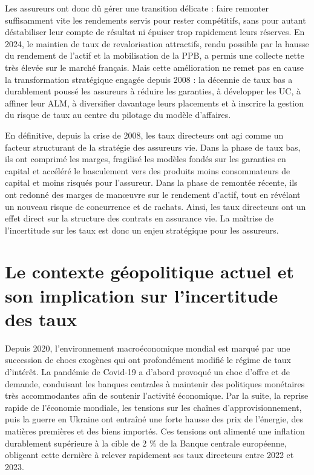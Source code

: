 Les assureurs ont donc dû gérer une transition délicate : faire remonter suffisamment vite les rendements servis pour rester compétitifs, sans pour autant déstabiliser leur compte de résultat ni épuiser trop rapidement leurs réserves. En 2024, le maintien de taux de revalorisation attractifs, rendu possible par la hausse du rendement de l'actif et la mobilisation de la PPB, a permis une collecte nette très élevée sur le marché français. Mais cette amélioration ne remet pas en cause la transformation stratégique engagée depuis 2008 : la décennie de taux bas a durablement poussé les assureurs à réduire les garanties, à développer les UC, à affiner leur ALM, à diversifier davantage leurs placements et à inscrire la gestion du risque de taux au centre du pilotage du modèle d'affaires.

En définitive, depuis la crise de 2008, les taux directeurs ont agi comme un facteur structurant de la stratégie des assureurs vie. Dans la phase de taux bas, ils ont comprimé les marges, fragilisé les modèles fondés sur les garanties en capital et accéléré le basculement vers des produits moins consommateurs de capital et moins risqués pour l'assureur. Dans la phase de remontée récente, ils ont redonné des marges de manœuvre sur le rendement d'actif, tout en révélant un nouveau risque de concurrence et de rachats. Ainsi, les taux directeurs ont un effet direct sur la structure des contrats en assurance vie. La maîtrise de l'incertitude sur les taux est donc un enjeu stratégique pour les assureurs.





\section{Le contexte géopolitique actuel et son implication sur l'incertitude des taux}

Depuis 2020, l'environnement macroéconomique mondial est marqué par une succession de chocs exogènes qui ont profondément modifié le régime de taux d'intérêt. La pandémie de Covid-19 a d'abord provoqué un choc d'offre et de demande, conduisant les banques centrales à maintenir des politiques monétaires très accommodantes afin de soutenir l'activité économique. Par la suite, la reprise rapide de l'économie mondiale, les tensions sur les chaînes d'approvisionnement, puis la guerre en Ukraine ont entraîné une forte hausse des prix de l'énergie, des matières premières et des biens importés. Ces tensions ont alimenté une inflation durablement supérieure à la cible de 2 \% de la Banque centrale européenne, obligeant cette dernière à relever rapidement ses taux directeurs entre 2022 et 2023.

